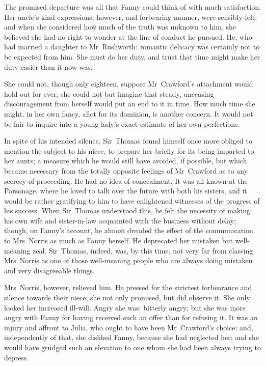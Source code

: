 The promised departure was all that Fanny could think of with much satisfaction. Her uncle's kind expressions, however, and forbearing manner, were sensibly felt; and when she considered how much of the truth was unknown to him, she believed she had no right to wonder at the line of conduct he pursued. He, who had married a daughter to Mr~Rushworth: romantic delicacy was certainly not to be expected from him. She must do her duty, and trust that time might make her duty easier than it now was.

She could not, though only eighteen, suppose Mr~Crawford's attachment would hold out for ever; she could not but imagine that steady, unceasing discouragement from herself would put an end to it in time. How much time she might, in her own fancy, allot for its dominion, is another concern. It would not be fair to inquire into a young lady's exact estimate of her own perfections.

In spite of his intended silence, Sir~Thomas found himself once more obliged to mention the subject to his niece, to prepare her briefly for its being imparted to her aunts; a measure which he would still have avoided, if possible, but which became necessary from the totally opposite feelings of Mr~Crawford as to any secrecy of proceeding. He had no idea of concealment. It was all known at the Parsonage, where he loved to talk over the future with both his sisters, and it would be rather gratifying to him to have enlightened witnesses of the progress of his success. When Sir~Thomas understood this, he felt the necessity of making his own wife and sister-in-law acquainted with the business without delay; though, on Fanny's account, he almost dreaded the effect of the communication to Mrs~Norris as much as Fanny herself. He deprecated her mistaken but well-meaning zeal. Sir~Thomas, indeed, was, by this time, not very far from classing Mrs~Norris as one of those well-meaning people who are always doing mistaken and very disagreeable things.

Mrs~Norris, however, relieved him. He pressed for the strictest forbearance and silence towards their niece; she not only promised, but did observe it. She only looked her increased ill-will. Angry she was: bitterly angry; but she was more angry with Fanny for having received such an offer than for refusing it. It was an injury and affront to Julia, who ought to have been Mr~Crawford's choice; and, independently of that, she disliked Fanny, because she had neglected her; and she would have grudged such an elevation to one whom she had been always trying to depress.

